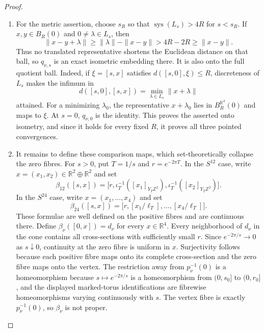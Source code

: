 \begin{proof}
\begin{enumerate}[label=\arabic*.,leftmargin=*]
\item For the metric assertion, choose \(s_R\) so that
\(\operatorname{sys}(L_s)>4R\) for \(s<s_R\).  If
\(x,y\in B_R(0)\) and \(0\ne\lambda\in L_s\), then
\[
 \|x-y+\lambda\|
 \geq\|\lambda\|-\|x-y\|
 >4R-2R\geq\|x-y\|.
\]
Thus no translated representative shortens the Euclidean distance on that
ball, so \(q_{\nu,s}\) is an exact isometric embedding there.  It is also
onto the full quotient ball.  Indeed, if \(\xi=[s,x]\) satisfies
\(d([s,0],\xi)\leq R\), discreteness of \(L_s\) makes the infimum in
\[
 d([s,0],[s,x])=\min_{\lambda\in L_s}\|x+\lambda\|
\]
attained.  For a minimizing \(\lambda_0\), the representative
\(x+\lambda_0\) lies in \(B_R^{\mathbb R^4}(0)\) and maps to \(\xi\).  At
\(s=0\), \(q_{\nu,0}\) is the identity.  This proves the asserted onto
isometry, and since it holds for every fixed \(R\), it proves all three
pointed convergences.

\item It remains to define these comparison maps, which set-theoretically collapse
the zero fibres.  For \(s>0\), put
\(T=1/s\) and \(r=e^{-2\pi T}\).  In the \(S^{12}\) case, write
\(x=(x_1,x_2)\in\mathbb R^2\oplus\mathbb R^2\) and set
\[
 \beta_{12}([s,x])
 =\bigl[r,
 \iota_T^{-1}([x_1]_{Y_T\mathbb Z^2}),
 \iota_T^{-1}([x_2]_{Y_T\mathbb Z^2})\bigr].
\]
In the \(S^{24}\) case, write
\(x=(x_1,\ldots,x_4)\) and set
\[
 \beta_{24}([s,x])
 =\bigl[r,
 [x_1/\ell_T],\ldots,[x_4/\ell_T]\bigr].
\]
These formulae are well defined on the positive fibres and are continuous
there.  Define \(\beta_\nu([0,x])=d_\nu\) for every \(x\in\mathbb R^4\).
Every neighborhood of \(d_\nu\) in the cone contains all cross-sections
with sufficiently small \(r\).  Since \(e^{-2\pi/s}\to0\) as
\(s\downarrow0\), continuity at the zero fibre is uniform in \(x\).
Surjectivity follows because each positive fibre maps onto its complete
cross-section and the zero fibre maps onto the vertex.  The restriction away
from \(p_\nu^{-1}(0)\) is a homeomorphism because
\(s\mapsto e^{-2\pi/s}\) is a homeomorphism from \((0,s_0]\) to
\((0,r_0]\), and the displayed marked-torus identifications are fibrewise
homeomorphisms varying continuously with \(s\).  The vertex fibre is exactly
\(p_\nu^{-1}(0)\), so \(\beta_\nu\) is not proper.


\end{enumerate}
\end{proof}
